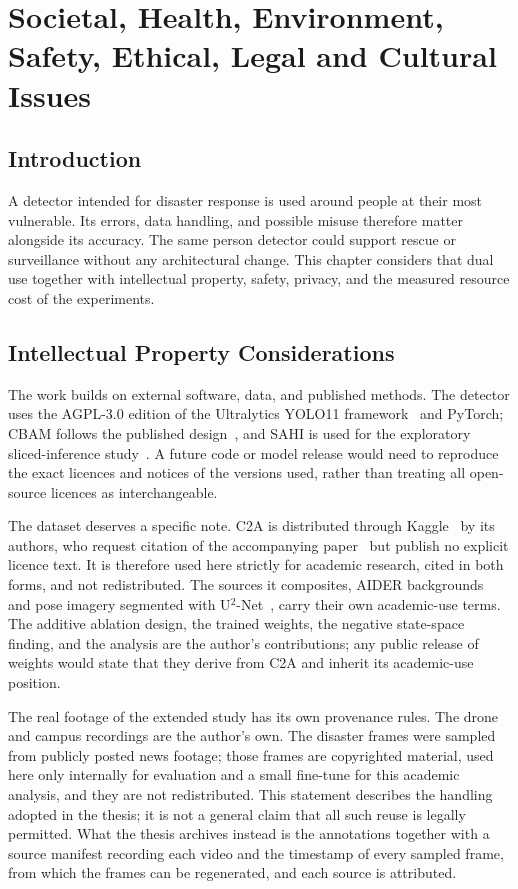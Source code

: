 \chapter{Societal, Health, Environment, Safety, Ethical, Legal and Cultural Issues}

\section{Introduction}
A detector intended for disaster response is used around people at their most
vulnerable. Its errors, data handling, and possible misuse therefore matter
alongside its accuracy. The same person detector could support rescue or
surveillance without any architectural change. This chapter considers that
dual use together with intellectual property, safety, privacy, and the measured
resource cost of the experiments.

\section{Intellectual Property Considerations}
The work builds on external software, data, and published methods. The detector
uses the AGPL-3.0 edition of the Ultralytics YOLO11
framework~\cite{jocher2024yolo11} and PyTorch; CBAM
follows the published design~\cite{woo2018cbam}, and SAHI is used for the
exploratory sliced-inference study~\cite{akyon2022sahi}. A future code or model
release would need to reproduce the exact licences and notices of the versions
used, rather than treating all open-source licences as interchangeable.

The dataset deserves a specific note. C2A is distributed through
Kaggle~\cite{c2akaggle} by its authors, who request citation of the
accompanying paper~\cite{nihal2024c2a} but publish no explicit licence text.
It is therefore used here strictly for academic research, cited in both
forms, and not redistributed. The sources it composites, AIDER
backgrounds~\cite{kyrkou2020aider} and pose imagery segmented with
U$^2$-Net~\cite{qin2020u2net}, carry their own academic-use terms. The
additive ablation design, the trained weights, the negative state-space
finding, and the analysis are the author's contributions; any public release
of weights would state that they derive from C2A and inherit its
academic-use position.

The real footage of the extended study has its own provenance rules. The
drone and campus recordings are the author's own. The disaster frames were
sampled from publicly posted news footage; those frames are copyrighted
material, used here only internally for evaluation and a small fine-tune
for this academic analysis, and they are not redistributed. This statement
describes the handling adopted in the thesis; it is not a general claim that
all such reuse is legally permitted. What the
thesis archives instead is the annotations together with a source manifest
recording each video and the timestamp of every sampled frame, from which
the frames can be regenerated, and each source is attributed.

